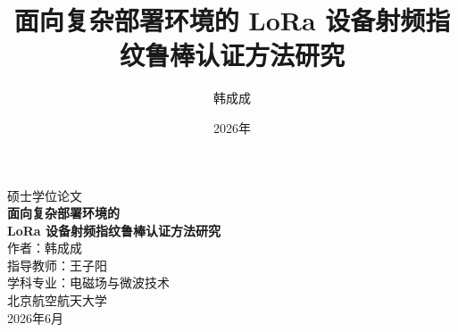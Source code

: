 \documentclass[12pt,a4paper,openany,fontset=fandol]{ctexbook}
\title{面向复杂部署环境的 LoRa 设备射频指纹鲁棒认证方法研究}
\author{韩成成}
\date{2026年}
\begin{document}
\begin{titlepage}
  \centering
  \vspace*{2cm}
  {\LARGE 硕士学位论文}\\[1.5cm]
  {\Huge\bfseries 面向复杂部署环境的\\LoRa 设备射频指纹鲁棒认证方法研究}\\[2cm]
  {\Large 作者：韩成成}\\[0.5cm]
  {\Large 指导教师：王子阳}\\[0.5cm]
  {\Large 学科专业：电磁场与微波技术}\\[0.5cm]
  {\Large 北京航空航天大学}\\[0.5cm]
  {\Large 2026年6月}
  \vfill
\end{titlepage}

\frontmatter


\tableofcontents
\listoffigures
\listoftables

\mainmatter







\backmatter


\end{document}

